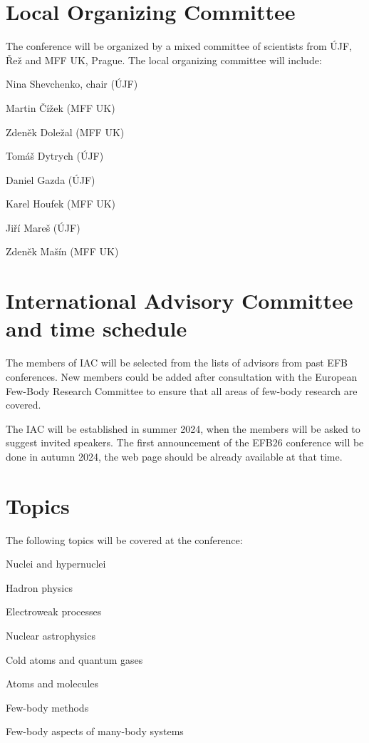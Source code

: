 \documentclass[12pt]{extarticle}
\newcommand*\sq{\mathbin{\vcenter{\hbox{\rule{.8ex}{.8ex}}}}}
\newenvironment{t_sq_itemize}
{\begin{itemize}[topsep=0pt, parsep=0pt, itemsep=0pt, leftmargin=*]
    \renewcommand{\labelitemi}{{\(\sq\)}}}
  {\end{itemize}}
\begin{document}
\section*{Local Organizing Committee}
\noindent
%
The conference will be organized by a mixed committee of scientists from ÚJF, Řež and MFF UK, Prague.
The local organizing committee will include:
\begin{t_sq_itemize}
  \def\ujf{ÚJF}%
  \def\mff{MFF UK}%
\item Nina Shevchenko, chair (\ujf)
\item Martin Čížek (\mff)
\item Zdeněk Doležal (\mff)
\item Tomáš Dytrych (\ujf)
\item Daniel Gazda (\ujf)
\item Karel Houfek (\mff)
\item Jiří Mareš (\ujf)
\item Zdeněk Mašín (\mff)
\end{t_sq_itemize}

\section*{International Advisory Committee and time schedule}
\noindent
The members of IAC will be selected from the lists of advisors from
past EFB conferences. New members could be added after consultation
with the European Few-Body Research Committee to ensure that all areas
of few-body research are covered.

The IAC will be established in summer 2024, when the members will be
asked to suggest invited speakers. The first announcement of the EFB26
conference will be done in autumn 2024, the web page should be already
available at that time.

\section*{Topics}
\noindent
The following topics will be covered at the conference:
\begin{t_sq_itemize}
\item Nuclei and hypernuclei
\item Hadron physics
\item Electroweak processes
\item Nuclear astrophysics
\item Cold atoms and quantum gases
\item Atoms and molecules
\item Few-body methods
\item Few-body aspects of many-body systems
\end{t_sq_itemize}
\end{document}
